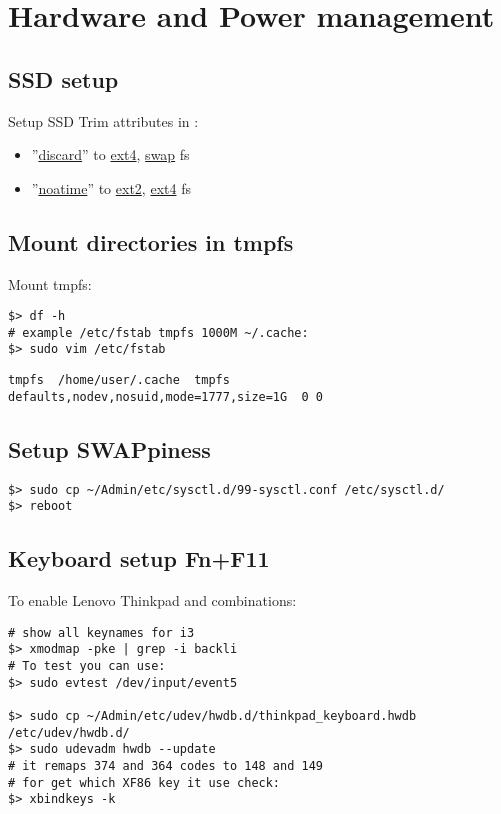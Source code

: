 \documentclass[a4paper, 12pt]{article}
\begin{document}
\section{Hardware and Power management}

\subsection{SSD setup}
Setup SSD Trim attributes in :
\begin{itemize}
\item ''\url{discard}'' to \url{ext4}, \url{swap} fs
\item ''\url{noatime}'' to \url{ext2}, \url{ext4} fs
\end{itemize}

\subsection{Mount directories in tmpfs}
Mount tmpfs:
\begin{lstlisting}
$> df -h
# example /etc/fstab tmpfs 1000M ~/.cache:
$> sudo vim /etc/fstab
\end{lstlisting}

\begin{lstlisting}[style=style_file,caption={/etc/fstab add line:}]
tmpfs  /home/user/.cache  tmpfs  defaults,nodev,nosuid,mode=1777,size=1G  0 0
\end{lstlisting}

\subsection{Setup SWAPpiness}
\begin{lstlisting}
$> sudo cp ~/Admin/etc/sysctl.d/99-sysctl.conf /etc/sysctl.d/
$> reboot
\end{lstlisting}

\subsection{Keyboard setup Fn+F11}
To enable Lenovo Thinkpad  and  combinations:
\begin{lstlisting}
# show all keynames for i3
$> xmodmap -pke | grep -i backli
# To test you can use:
$> sudo evtest /dev/input/event5

$> sudo cp ~/Admin/etc/udev/hwdb.d/thinkpad_keyboard.hwdb /etc/udev/hwdb.d/
$> sudo udevadm hwdb --update
# it remaps 374 and 364 codes to 148 and 149
# for get which XF86 key it use check:
$> xbindkeys -k
\end{lstlisting}
\end{document}
